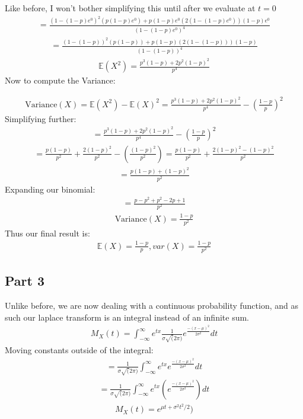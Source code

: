 \documentclass{article}
\begin{document}
Like before, I won't bother simplifying this until after we evaluate at $t=0$
\begin{align*}
=\frac{(1-(1-p)e^0)^2(p(1-p)e^0)+p(1-p)e^0(2(1-(1-p)e^0))(1-p)e^0}{(1-(1-p)e^0)^4}
\end{align*}
\begin{align*}
=\frac{(1-(1-p))^2(p(1-p))+p(1-p)(2(1-(1-p)))(1-p)}{(1-(1-p))^4} 
\end{align*}
\begin{align*}
\mathbb{E}(X^2)=\frac{p^3(1-p)+2p^2(1-p)^2}{p^4}
\end{align*}
Now to compute the Variance:

\begin{align*}
\text{Variance}(X) = \mathbb{E}(X^2)-\mathbb{E}(X)^2 = \frac{p^3(1-p)+2p^2(1-p)^2}{p^4} - (\frac{1-p}{p})^2
\end{align*}
Simplifying further:
\begin{align*}
 = \frac{p^3(1-p)+2p^2(1-p)^2}{p^4} - (\frac{1-p}{p})^2
\end{align*}
\begin{align*}
 = \frac{p(1-p)}{p^2}+\frac{2(1-p)^2}{p^2} - (\frac{(1-p)^2}{p^2}) = \frac{p(1-p)}{p^2}+\frac{2(1-p)^2-(1-p)^2}{p^2}
\end{align*}
\begin{align*}
 = \frac{p(1-p)+(1-p)^2}{p^2}
\end{align*}
Expanding our binomial:
\begin{align*}
 = \frac{p-p^2 + p^2 -2p +1}{p^2}
\end{align*}
\begin{align*}
\boxed{\text{Variance}(X) = \frac{1-p}{p^2}}
\end{align*}
Thus our final result is:
\begin{align*}
\boxed{ \mathbb{E}(X)= \frac{1-p}{p}, var(X) = \frac{1-p}{p^2} }
\end{align*}
\subsection*{Part 3}
Unlike before, we are now dealing with a continuous probability function, and as such our laplace transform is an integral instead of an infinite sum.
\begin{align*}
M_X(t) = \int_{-\infty}^{\infty} e^{t x} \frac{1}{\sigma \sqrt(2 \pi)} e^{\frac{-(x-\mu)^2}{2 \sigma^2}} dt
\end{align*}
Moving constants outside of the integral:
\begin{align*}
 = \frac{1}{\sigma \sqrt(2 \pi)} \int_{-\infty}^{\infty} e^{t x} e^{\frac{-(x-\mu)^2}{2 \sigma^2}} dt
\end{align*}
\begin{align*}
 = \frac{1}{\sigma \sqrt(2 \pi)} \int_{-\infty}^{\infty} e^{t x} (e^{\frac{-(x-\mu)^2}{2 \sigma^2}}) dt
\end{align*}
\begin{align*}
\boxed{M_X(t) = e^{\mu t + \sigma^2t^2/2}) }
\end{align*}
\end{document}
